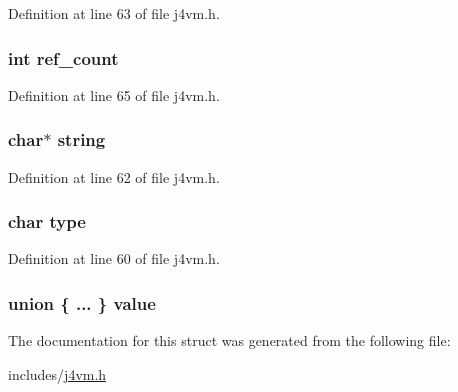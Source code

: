 Definition at line 63 of file j4vm.\+h.

\hypertarget{structobject_a223a278e0bf3b42ae887efe07bfbeac0}{
\subsubsection[{ref\+\_\+count}]{\setlength{\rightskip}{0pt plus 5cm}int ref\+\_\+count}}\label{structobject_a223a278e0bf3b42ae887efe07bfbeac0}


Definition at line 65 of file j4vm.\+h.

\hypertarget{structobject_aed1cfb225a5fb77461e7972691e68a72}{
\subsubsection[{string}]{\setlength{\rightskip}{0pt plus 5cm}char$\ast$ string}}\label{structobject_aed1cfb225a5fb77461e7972691e68a72}


Definition at line 62 of file j4vm.\+h.

\hypertarget{structobject_aff17911edc8208aa8ddb1c7c52c78389}{
\subsubsection[{type}]{\setlength{\rightskip}{0pt plus 5cm}char type}}\label{structobject_aff17911edc8208aa8ddb1c7c52c78389}


Definition at line 60 of file j4vm.\+h.

\hypertarget{structobject_a74d70d0c0c333c8edb2c2ce371e4640a}{
\subsubsection[{value}]{\setlength{\rightskip}{0pt plus 5cm}union \{ ... \}   value}}\label{structobject_a74d70d0c0c333c8edb2c2ce371e4640a}


The documentation for this struct was generated from the following file\+:\begin{DoxyCompactItemize}
\item 
includes/\hyperlink{j4vm_8h}{j4vm.\+h}\end{DoxyCompactItemize}

